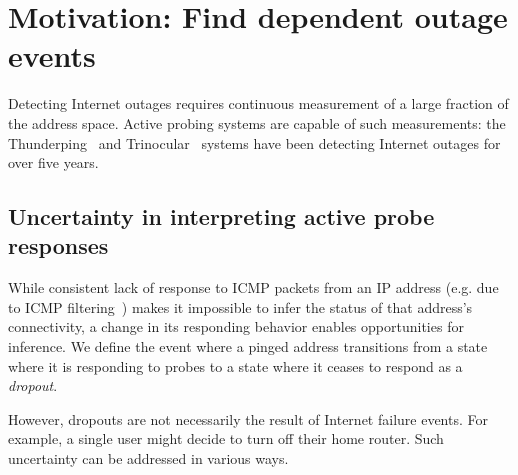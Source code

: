 
\section{Motivation: Find dependent outage events}
\label{sec:bg}


Detecting Internet outages requires
continuous measurement of a large fraction of the address space. Active
probing systems are capable of such measurements: the Thunderping~\cite{pingin} and
Trinocular~\cite{trinocular} systems have been detecting Internet outages for
over five years. %

\subsection{Uncertainty in interpreting active probe responses}

%
While consistent lack of response to ICMP packets from an IP address
(e.g. due to ICMP filtering~\cite{v4-census-imc16}) makes it impossible
to infer the status of that address's connectivity, a change in its responding
behavior enables opportunities for inference.  We define the event
where a pinged address transitions from a state where it is responding to probes to a state where it ceases to respond as a \emph{dropout}.  

However, dropouts are not necessarily the result of Internet failure
events. For example, a single user might decide to turn off their home
router. Such uncertainty can be addressed
in various ways.

